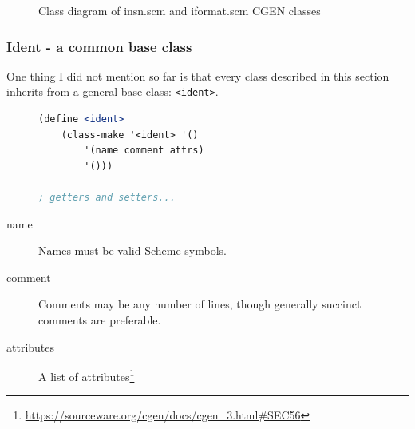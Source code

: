 \documentclass{article}
\begin{document}
\begin{figure}[H]
	\centering
	\caption{Class diagram of insn.scm and iformat.scm CGEN classes}
\end{figure}

\subsubsection{Ident - a common base class}
One thing I did not mention so far is that every class described in this section inherits from a general base class: \texttt{<ident>}.

\begin{figure}[H]
\begin{lstlisting}[language=Scheme, caption=<ident> class declaration]
(define <ident>
	(class-make '<ident> '()
		'(name comment attrs)
		'()))

; getters and setters...
\end{lstlisting}
\end{figure}

\begin{description}
\item[name] Names must be valid Scheme symbols.
\item[comment] Comments may be any number of lines, though generally succinct comments are preferable.
\item[attributes] A list of attributes\footnote{\url{https://sourceware.org/cgen/docs/cgen_3.html\#SEC56}}
\end{description}
\clearpage
\end{document}

